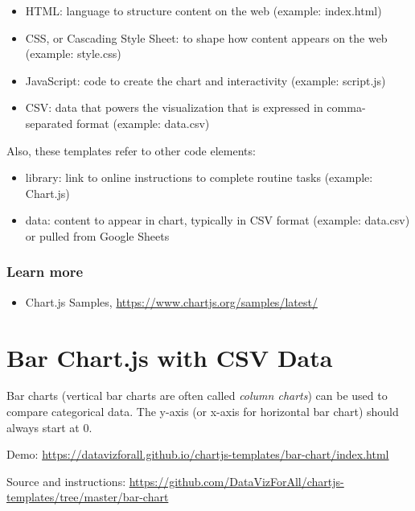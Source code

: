 \documentclass[
  english,
]{book}
\providecommand{\tightlist}{%
  \setlength{\itemsep}{0pt}\setlength{\parskip}{0pt}}
\begin{document}
\begin{itemize}
\tightlist
\item
  HTML: language to structure content on the web (example: index.html)
\item
  CSS, or Cascading Style Sheet: to shape how content appears on the web (example: style.css)
\item
  JavaScript: code to create the chart and interactivity (example: script.js)
\item
  CSV: data that powers the visualization that is expressed in comma-separated format (example: data.csv)
\end{itemize}

Also, these templates refer to other code elements:

\begin{itemize}
\tightlist
\item
  library: link to online instructions to complete routine tasks (example: Chart.js)
\item
  data: content to appear in chart, typically in CSV format (example: data.csv) or pulled from Google Sheets
\end{itemize}

\hypertarget{learn-more-20}{%
\subsubsection*{Learn more}\label{learn-more-20}}

\begin{itemize}
\tightlist
\item
  Chart.js Samples, \url{https://www.chartjs.org/samples/latest/}
\end{itemize}

\hypertarget{chartjs-bar}{%
\section{Bar Chart.js with CSV Data}\label{chartjs-bar}}

Bar charts (vertical bar charts are often called \emph{column charts}) can be used to compare categorical data. The y-axis (or x-axis for horizontal bar chart) should always start at 0.

Demo: \url{https://datavizforall.github.io/chartjs-templates/bar-chart/index.html}

Source and instructions: \url{https://github.com/DataVizForAll/chartjs-templates/tree/master/bar-chart}
\end{document}
